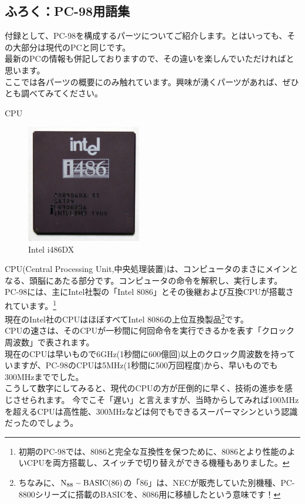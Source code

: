 \documentclass[b5paper,9pt,platex,dvipdfmx]{jsarticle}
\begin{document}
\begin{multicols}{3}
\part{ふろく：PC-98用語集}
付録として、PC-98を構成するパーツについてご紹介します。とはいっても、その大部分は現代のPCと同じです。\\
最新のPCの情報も併記しておりますので、その違いを楽しんでいただければと思います。\\
ここでは各パーツの概要にのみ触れています。興味が湧くパーツがあれば、ぜひとも調べてみてください。\\
\begin{enumerate}
  {\bf  \item CPU\\}
  \begin{figure}[H]
    \centering
    \includegraphics[width=5cm]{img-5.jpg}
    \caption{Intel i486DX}
  \end{figure}
CPU(Central Processing Unit,中央処理装置)は、コンピュータのまさにメインとなる、頭脳にあたる部分です。コンピュータの命令を解釈し、実行します。\\
PC-98には、主にIntel社製の「Intel 8086」とその後継および互換CPUが搭載されています。\footnote{初期のPC-98では、8086と完全な互換性を保つために、8086とより性能のよいCPUを両方搭載し、スイッチで切り替えができる機種もありました。}\\
現在のIntel社のCPUはほぼすべてIntel 8086の上位互換製品\footnote{ちなみに、$\rm{N_{88}-BASIC (86)}$の「86」は、NECが販売していた別機種、PC-8800シリーズに搭載のBASICを、8086用に移植したという意味です！}です。\\
CPUの速さは、そのCPUが一秒間に何回命令を実行できるかを表す「クロック周波数」で表されます。\\
現在のCPUは早いもので6GHz(1秒間に600億回)以上のクロック周波数を持っていますが、PC-98のCPUは5MHz(1秒間に500万回程度)から、早いものでも300MHzまででした。\\
こうして数字にしてみると、現代のCPUの方が圧倒的に早く、技術の進歩を感じさせられます。
今でこそ「遅い」と言えますが、当時からしてみれば100MHzを超えるCPUは高性能、300MHzなどは何でもできるスーパーマシンという認識だったのでしょう。\\

\end{enumerate}
\end{multicols}
\end{document}

